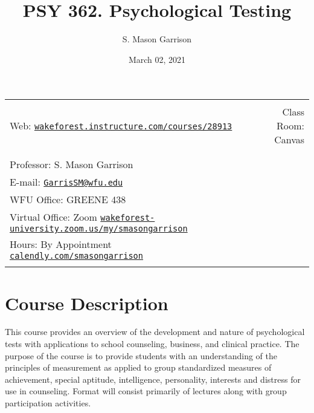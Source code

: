 \documentclass[11pt,]{article}
\title{PSY 362. Psychological Testing}
\author{S. Mason Garrison}
\date{March 02, 2021}
\begin{document}
		\maketitle


		\thispagestyle{firststyle}



\noindent \begin{tabular*}{\textwidth}{ @{\extracolsep{\fill}} lr @{\extracolsep{\fill}}}
\hline\\
Web: \href{https://wakeforest.instructure.com/courses/28913}{\tt wakeforest.instructure.com/courses/28913} & Class Room: Canvas\\ %
\\\hline\\
Professor: S. Mason Garrison \\

E-mail: \texttt{\href{mailto:GarrisSM@wfu.edu}{\nolinkurl{GarrisSM@wfu.edu}}}  \\

WFU Office: GREENE 438   \\
Virtual Office: Zoom
\href{https://wakeforest-university.zoom.us/my/smasongarrison}{\tiny\tt wakeforest-university.zoom.us/my/smasongarrison}   \\
Hours: By Appointment
\href{https://calendly.com/smasongarrison/}{\small\tt calendly.com/smasongarrison}  \\

	&  \\
	\hline
\end{tabular*}

\vspace{2mm}

\hypertarget{course-description}{%
\section{Course Description}\label{course-description}}

This course provides an overview of the development and nature of
psychological tests with applications to school counseling, business,
and clinical practice. The purpose of the course is to provide students
with an understanding of the principles of measurement as applied to
group standardized measures of achievement, special aptitude,
intelligence, personality, interests and distress for use in counseling.
Format will consist primarily of lectures along with group participation
activities.
\end{document}

